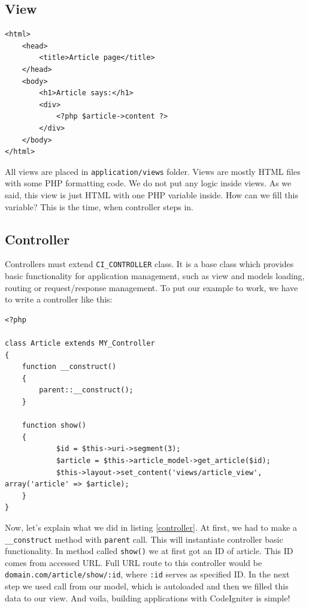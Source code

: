 
\subsection{View}

\begin{lstlisting}[label={view}, caption={Article view}]
<html>
	<head>
		<title>Article page</title>
	</head>
	<body>
		<h1>Article says:</h1>
		<div>
			<?php $article->content ?>
		</div>
	</body>
</html>
\end{lstlisting}


All views are placed in \texttt{application/views} folder. Views are mostly
HTML files with some PHP formatting code. We do not put any logic inside
views. As we said, this view is just HTML with one PHP variable inside. How
can we fill this variable? This is the time, when controller steps in.


\subsection{Controller}
Controllers must extend \texttt{CI\_CONTROLLER} class. It is a base class which provides basic functionality for application management, such as view and models loading, routing or request/response management. To put our example to work, we have to write a controller like this:

\begin{lstlisting}[label={controller}, caption={Article controller}]
<?php

class Article extends MY_Controller
{
    function __construct()
    {
        parent::__construct();
    }

    function show()
    {
    		$id = $this->uri->segment(3);
    		$article = $this->article_model->get_article($id);
    		$this->layout->set_content('views/article_view', array('article' => $article);
    }
}
\end{lstlisting}


Now, let's explain what we did in listing \ref{controller}. At first, we had to make a \texttt{\_\_construct} method with \texttt{parent} call. This will instantiate controller basic functionality. In method called \texttt{show()} we at first got an ID of article. This ID comes from accessed URL. Full URL route to this controller would be \texttt{domain.com/article/show/:id}, where \texttt{:id} serves as specified ID. In the next step we used call from our model, which is autoloaded and then we filled this data to our view. And voila, building applications with CodeIgniter is simple!


